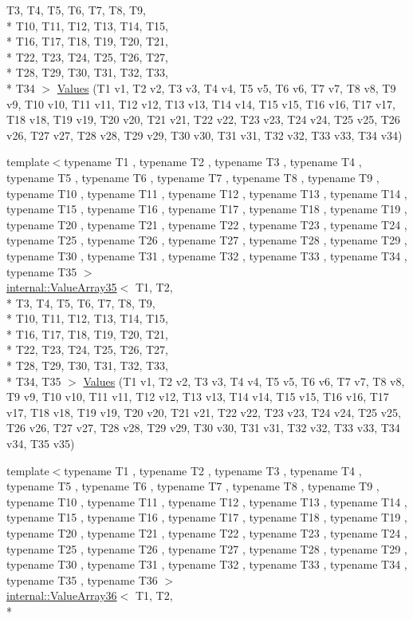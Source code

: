 \begin{DoxyCompactItemize}
T3, T4, T5, T6, T7, T8, T9, \\*
T10, T11, T12, T13, T14, T15, \\*
T16, T17, T18, T19, T20, T21, \\*
T22, T23, T24, T25, T26, T27, \\*
T28, T29, T30, T31, T32, T33, \\*
T34 $>$ \hyperlink{namespacetesting_a37ae9a0b15ed1e02fda22769ef76c97e}{Values} (T1 v1, T2 v2, T3 v3, T4 v4, T5 v5, T6 v6, T7 v7, T8 v8, T9 v9, T10 v10, T11 v11, T12 v12, T13 v13, T14 v14, T15 v15, T16 v16, T17 v17, T18 v18, T19 v19, T20 v20, T21 v21, T22 v22, T23 v23, T24 v24, T25 v25, T26 v26, T27 v27, T28 v28, T29 v29, T30 v30, T31 v31, T32 v32, T33 v33, T34 v34)
\item 
{\footnotesize template$<$typename T1 , typename T2 , typename T3 , typename T4 , typename T5 , typename T6 , typename T7 , typename T8 , typename T9 , typename T10 , typename T11 , typename T12 , typename T13 , typename T14 , typename T15 , typename T16 , typename T17 , typename T18 , typename T19 , typename T20 , typename T21 , typename T22 , typename T23 , typename T24 , typename T25 , typename T26 , typename T27 , typename T28 , typename T29 , typename T30 , typename T31 , typename T32 , typename T33 , typename T34 , typename T35 $>$ }\\\hyperlink{classtesting_1_1internal_1_1_value_array35}{internal\-::\-Value\-Array35}$<$ T1, T2, \\*
T3, T4, T5, T6, T7, T8, T9, \\*
T10, T11, T12, T13, T14, T15, \\*
T16, T17, T18, T19, T20, T21, \\*
T22, T23, T24, T25, T26, T27, \\*
T28, T29, T30, T31, T32, T33, \\*
T34, T35 $>$ \hyperlink{namespacetesting_a8746425c9d27e46ea5bc5fd77586bc2a}{Values} (T1 v1, T2 v2, T3 v3, T4 v4, T5 v5, T6 v6, T7 v7, T8 v8, T9 v9, T10 v10, T11 v11, T12 v12, T13 v13, T14 v14, T15 v15, T16 v16, T17 v17, T18 v18, T19 v19, T20 v20, T21 v21, T22 v22, T23 v23, T24 v24, T25 v25, T26 v26, T27 v27, T28 v28, T29 v29, T30 v30, T31 v31, T32 v32, T33 v33, T34 v34, T35 v35)
\item 
{\footnotesize template$<$typename T1 , typename T2 , typename T3 , typename T4 , typename T5 , typename T6 , typename T7 , typename T8 , typename T9 , typename T10 , typename T11 , typename T12 , typename T13 , typename T14 , typename T15 , typename T16 , typename T17 , typename T18 , typename T19 , typename T20 , typename T21 , typename T22 , typename T23 , typename T24 , typename T25 , typename T26 , typename T27 , typename T28 , typename T29 , typename T30 , typename T31 , typename T32 , typename T33 , typename T34 , typename T35 , typename T36 $>$ }\\\hyperlink{classtesting_1_1internal_1_1_value_array36}{internal\-::\-Value\-Array36}$<$ T1, T2, \\*

\end{DoxyCompactItemize}
